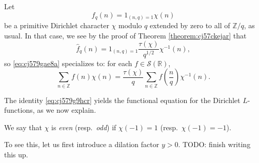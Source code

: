 \documentclass[reqno]{amsart}  \numberwithin{theorem}{section} \numberwithin{equation}{section}
\begin{document}
\begin{example}
  Let
  \begin{equation*}
    f_q(n) = 1_{(n, q) = 1} \chi (n)
  \end{equation*}
  be a primitive Dirichlet character $\chi$ modulo $q$ extended by zero to all of $\mathbb{Z} / q$, as usual.  In that case, we see by the proof of Theorem \ref{theorem:cj57ckejar} that
  \begin{equation*}
    \hat{f}_q (n) = 1_{(n,q) = 1} \frac{\tau(\chi) }{ q^{1/2} } \chi^{-1} (n),
  \end{equation*}
  so \eqref{eq:cj579gae8a} specializes to: for each $f \in \mathcal{S}(\mathbb{R})$,
  \begin{equation}\label{eq:cj579g9hcr}
    \sum_{n \in \mathbb{Z} } f (n) \chi (n) = \frac{\tau(\chi )}{ q } \sum_{n \in \mathbb{Z} } \hat{f} \left( \frac{n}{q} \right) \chi^{-1} (n).
  \end{equation}
\end{example}

The identity \eqref{eq:cj579g9hcr} yields the functional equation for the Dirichlet $L$-functions, as we now explain.

\begin{definition}\label{definition:cj579hfk0m}
We say that $\chi$ is \emph{even} (resp.\ \emph{odd}) if $\chi(-1) = 1$ (resp.\ $\chi(-1) = -1$).
\end{definition}

To see this, let us first introduce a dilation factor $y > 0$.  TODO: finish writing this up.





\end{document}
